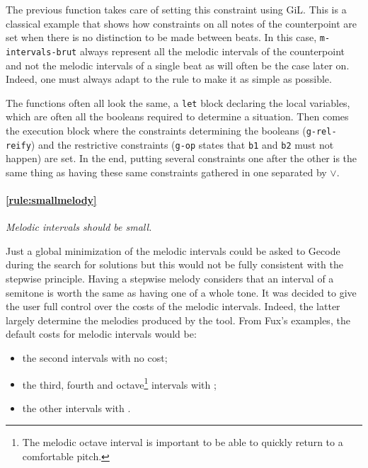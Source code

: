 The previous function takes care of setting this constraint using GiL. This is a classical example that shows how constraints on all notes of the counterpoint are set when there is no distinction to be made between beats. In this case, \texttt{m-intervals-brut} always represent all the melodic intervals of the counterpoint and not the melodic intervals of a single beat as will often be the case later on. Indeed, one must always adapt to the rule to make it as simple as possible.

The functions often all look the same, a \texttt{let} block declaring the local variables, which are often all the booleans required to determine a situation. Then comes the execution block where the constraints determining the booleans (\texttt{g-rel-reify}) and the restrictive constraints (\texttt{g-op} states that \texttt{b1} and \texttt{b2} must not happen) are set. In the end, putting several constraints one after the other is the same thing as having these same constraints gathered in one separated by $\lor$.

\paragraph{\ref{rule:smallmelody}} \textit{Melodic intervals should be small.}

Just a global minimization of the melodic intervals could be asked to Gecode during the search for solutions but this would not be fully consistent with the stepwise principle. Having a stepwise melody considers that an interval of a semitone is worth the same as having one of a whole tone. It was decided to give the user full control over the costs of the melodic intervals. Indeed, the latter largely determine the melodies produced by the tool. From Fux's examples, the default costs for melodic intervals would be:
\begin{itemize}
    \item the second intervals with no cost;
    \item the third, fourth and octave\footnote{The melodic octave interval is important to be able to quickly return to a comfortable pitch.} intervals with ;
    \item the other intervals with .
\end{itemize}

